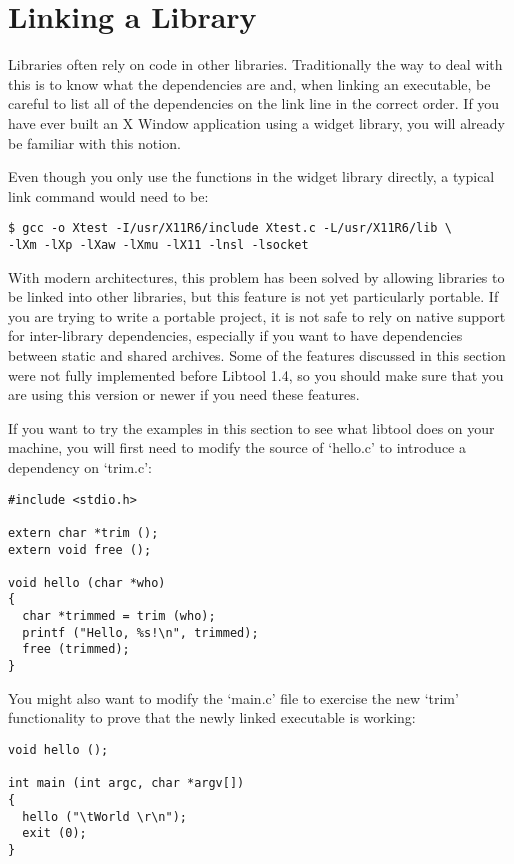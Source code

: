 \section{Linking a Library}\label{S_Linking a Library}
Libraries often rely on code in other libraries. Traditionally the way to deal with this is to know what the dependencies are and, when linking an executable, be careful to list all of the dependencies on the link line in the correct order. If you have ever built an X Window application using a widget library, you will already be familiar with this notion. 


Even though you only use the functions in the widget library directly, a typical link command would need to be: 

\begin{Verbatim}
$ gcc -o Xtest -I/usr/X11R6/include Xtest.c -L/usr/X11R6/lib \
-lXm -lXp -lXaw -lXmu -lX11 -lnsl -lsocket
\end{Verbatim}

With modern architectures, this problem has been solved by allowing libraries to be linked into other libraries, but this feature is not yet particularly portable. If you are trying to write a portable project, it is not safe to rely on native support for inter-library dependencies, especially if you want to have dependencies between static and shared archives. Some of the features discussed in this section were not fully implemented before Libtool 1.4, so you should make sure that you are using this version or newer if you need these features. 

If you want to try the examples in this section to see what libtool does on your machine, you will first need to modify the source of `hello.c' to introduce a dependency on `trim.c': 


\begin{Verbatim}
#include <stdio.h>

extern char *trim ();
extern void free ();

void hello (char *who)
{
  char *trimmed = trim (who);
  printf ("Hello, %s!\n", trimmed);
  free (trimmed);
}
\end{Verbatim}

 You might also want to modify the `main.c' file to exercise the new `trim' functionality to prove that the newly linked executable is working: 

\begin{Verbatim}
void hello ();

int main (int argc, char *argv[])
{
  hello ("\tWorld \r\n");
  exit (0);
}
\end{Verbatim}

